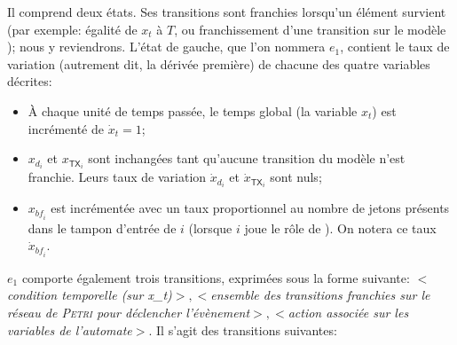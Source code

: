 Il comprend deux états.
Ses transitions sont franchies lorsqu'un élément survient (par exemple: égalité de $x_t$ à $T$, ou franchissement d'une transition sur le modèle \rpsge); nous y reviendrons.
L'état de gauche, que l'on nommera $e_1$, contient le taux de variation (autrement dit, la dérivée première) de chacune des quatre variables décrites:
\begin{itemize}
    \item À chaque unité de temps passée, le temps global (la variable $x_t$) est incrémenté de $\dot{x}_t=1$;
    \item $x_{d_i}$ et $x_{\mathsf{TX}_i}$ sont inchangées tant qu'aucune transition du modèle \rpsge n'est franchie.
        Leurs taux de variation $\dot{x}_{d_i}$ et $\dot{x}_{\mathsf{TX}_i}$ sont nuls;
    \item $x_{\mathit{bf}_i}$ est incrémentée avec un taux proportionnel au nombre de jetons présents dans le tampon d'entrée de $i$ (lorsque $i$ joue le rôle de \cn).
        On notera ce taux~$\dot{x}_{\mathit{bf}_i}$.
\end{itemize}
$e_1$ comporte également trois transitions, exprimées sous la forme suivante: $<$\textit{condition temporelle (sur x\_t)}$>, <$\textit{ensemble des transitions franchies sur le réseau de \textsc{Petri} pour déclencher l'évènement}$>, <$\textit{action associée sur les variables de l'automate}$>$.
Il s'agit des transitions suivantes:
